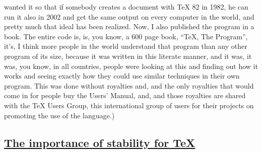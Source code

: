 \documentclass[]{article}
\begin{document}
wanted it so that if somebody creates a document with TeX 82 in 1982, he
can run it also in 2002 and get the same output on every computer in the
world, and pretty much that ideal has been realized. Now, I also
published the program in a book. The entire code is, is, you know, a 600
page book, ``TeX, The Program'', it's, I think more people in the world
understand that program than any other program of its size, because it
was written in this literate manner, and it was, it was, you know, in
all countries, people were looking at this and finding out how it works
and seeing exactly how they could use similar techniques in their own
program. This was done without royalties and, and the only royalties
that would come in for people buy the Users' Manual, and, and those
royalties are shared with the TeX Users Group, this international group
of users for their projects on promoting the use of the language.)

\subsection{\texorpdfstring{\href{http://webofstories.com/play/17127}{The
importance of stability for
TeX}}{The importance of stability for TeX}}\label{the-importance-of-stability-for-tex}
\end{document}
